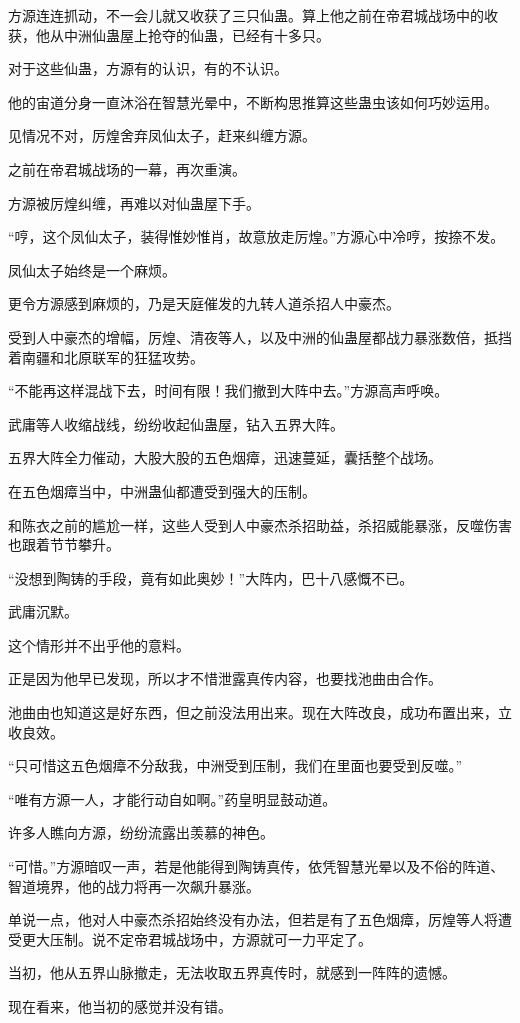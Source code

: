 \begin{this_body}
方源连连抓动，不一会儿就又收获了三只仙蛊。算上他之前在帝君城战场中的收获，他从中洲仙蛊屋上抢夺的仙蛊，已经有十多只。

对于这些仙蛊，方源有的认识，有的不认识。

他的宙道分身一直沐浴在智慧光晕中，不断构思推算这些蛊虫该如何巧妙运用。

见情况不对，厉煌舍弃凤仙太子，赶来纠缠方源。

之前在帝君城战场的一幕，再次重演。

方源被厉煌纠缠，再难以对仙蛊屋下手。

“哼，这个凤仙太子，装得惟妙惟肖，故意放走厉煌。”方源心中冷哼，按捺不发。

凤仙太子始终是一个麻烦。

更令方源感到麻烦的，乃是天庭催发的九转人道杀招人中豪杰。

受到人中豪杰的增幅，厉煌、清夜等人，以及中洲的仙蛊屋都战力暴涨数倍，抵挡着南疆和北原联军的狂猛攻势。

“不能再这样混战下去，时间有限！我们撤到大阵中去。”方源高声呼唤。

武庸等人收缩战线，纷纷收起仙蛊屋，钻入五界大阵。

五界大阵全力催动，大股大股的五色烟瘴，迅速蔓延，囊括整个战场。

在五色烟瘴当中，中洲蛊仙都遭受到强大的压制。

和陈衣之前的尴尬一样，这些人受到人中豪杰杀招助益，杀招威能暴涨，反噬伤害也跟着节节攀升。

“没想到陶铸的手段，竟有如此奥妙！”大阵内，巴十八感慨不已。

武庸沉默。

这个情形并不出乎他的意料。

正是因为他早已发现，所以才不惜泄露真传内容，也要找池曲由合作。

池曲由也知道这是好东西，但之前没法用出来。现在大阵改良，成功布置出来，立收良效。

“只可惜这五色烟瘴不分敌我，中洲受到压制，我们在里面也要受到反噬。”

“唯有方源一人，才能行动自如啊。”药皇明显鼓动道。

许多人瞧向方源，纷纷流露出羡慕的神色。

“可惜。”方源暗叹一声，若是他能得到陶铸真传，依凭智慧光晕以及不俗的阵道、智道境界，他的战力将再一次飙升暴涨。

单说一点，他对人中豪杰杀招始终没有办法，但若是有了五色烟瘴，厉煌等人将遭受更大压制。说不定帝君城战场中，方源就可一力平定了。

当初，他从五界山脉撤走，无法收取五界真传时，就感到一阵阵的遗憾。

现在看来，他当初的感觉并没有错。

\end{this_body}

